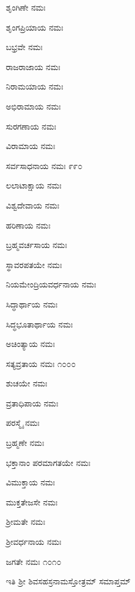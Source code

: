 ಶೃಂಗಿಣೇ ನಮಃ

ಶೃಂಗಪ್ರಿಯಾಯ ನಮಃ

ಬಭ್ರವೇ ನಮಃ

ರಾಜರಾಜಾಯ ನಮಃ

ನಿರಾಮಯಾಯ ನಮಃ

ಅಭಿರಾಮಾಯ ನಮಃ

ಸುರಗಣಾಯ ನಮಃ

ವಿರಾಮಾಯ ನಮಃ

ಸರ್ವಸಾಧನಾಯ ನಮಃ \num{೯೯೦}

ಲಲಾಟಾಕ್ಷಾಯ ನಮಃ

ವಿಶ್ವದೇವಾಯ ನಮಃ

ಹರಿಣಾಯ ನಮಃ

ಬ್ರಹ್ಮವರ್ಚಸಾಯ ನಮಃ

ಸ್ಥಾವರಪತಯೇ ನಮಃ

ನಿಯಮೇಂದ್ರಿಯವರ್ಧನಾಯ ನಮಃ

ಸಿದ್ಧಾರ್ಥಾಯ ನಮಃ

ಸಿದ್ಧಭೂತಾರ್ಥಾಯ ನಮಃ

ಅಚಿಂತ್ಯಾಯ ನಮಃ

ಸತ್ಯವ್ರತಾಯ ನಮಃ \num{೧೦೦೦}

ಶುಚಯೇ ನಮಃ

ವ್ರತಾಧಿಪಾಯ ನಮಃ

ಪರಸ್ಮೈ ನಮಃ

ಬ್ರಹ್ಮಣೇ ನಮಃ

ಭಕ್ತಾನಾಂ ಪರಮಾಗತಯೇ ನಮಃ

ವಿಮುಕ್ತಾಯ ನಮಃ

ಮುಕ್ತತೇಜಸೇ ನಮಃ

ಶ್ರೀಮತೇ ನಮಃ

ಶ್ರೀವರ್ಧನಾಯ ನಮಃ

ಜಗತೇ ನಮಃ \num{೧೦೧೦}

\begin{center}
ಇತಿ ಶ್ರೀ ಶಿವಸಹಸ್ರನಾಮಸ್ತೋತ್ರಮ್ ಸಮಾಪ್ತಮ್
\end{center}

